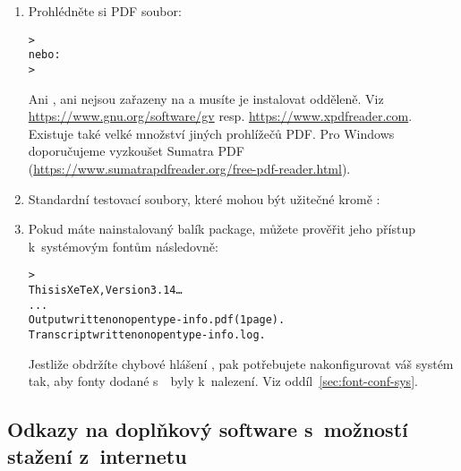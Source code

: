 \documentclass[\classoptions,slovak,english,czech]{\classname}
\newcommand{\singleuv}[1]{,#1`}
\begin{document}
\begin{enumerate}
\item Prohlédněte si PDF soubor:
\begin{alltt}
> 
\textrm{nebo:}
> 
\end{alltt}
Ani , ani  nejsou zařazeny na
\TL{} a musíte je instalovat odděleně.  Viz
\url{https://www.gnu.org/software/gv} resp.
\url{https://www.xpdfreader.com}. Existuje také velké množství 
jiných prohlížečů PDF.
Pro Windows doporučujeme vyzkoušet Sumatra PDF 
(\url{https://www.sumatrapdfreader.org/free-pdf-reader.html}).

\item Standardní testovací soubory, které mohou být 
užitečné kromě :


\item Pokud máte nainstalovaný balík  package, 
můžete prověřit jeho přístup k~systémovým fontům následovně:
\begin{alltt}
> 
This is XeTeX, Version 3.14\dots
...
Output written on opentype-info.pdf (1 page).
Transcript written on opentype-info.log.
\end{alltt}

Jestliže obdržíte chybové hlášení , pak potřebujete nakonfigurovat váš systém tak, aby 
fonty dodané s~\TL\ byly k~nalezení.  Viz
oddíl~\ref{sec:font-conf-sys}.
\end{enumerate}

\subsection{Odkazy na doplňkový software s~možností stažení z~internetu}
\end{document}
